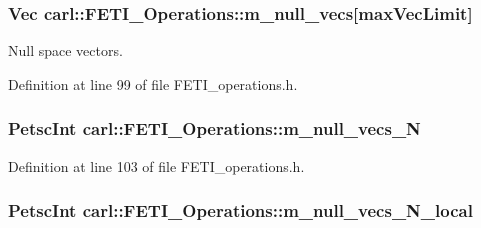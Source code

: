 \subsubsection[{m\+\_\+null\+\_\+vecs}]{\setlength{\rightskip}{0pt plus 5cm}Vec carl\+::\+F\+E\+T\+I\+\_\+\+Operations\+::m\+\_\+null\+\_\+vecs\mbox{[}{\bf max\+Vec\+Limit}\mbox{]}\hspace{0.3cm}{\ttfamily [protected]}}\label{classcarl_1_1_f_e_t_i___operations_a81ca84aa058155a0a0f586625c6f93b7}


Null space vectors. 



Definition at line 99 of file F\+E\+T\+I\+\_\+operations.\+h.

\hypertarget{classcarl_1_1_f_e_t_i___operations_aa9a450cb613998b62b4af846ff4b0453}{}
\subsubsection[{m\+\_\+null\+\_\+vecs\+\_\+\+N}]{\setlength{\rightskip}{0pt plus 5cm}Petsc\+Int carl\+::\+F\+E\+T\+I\+\_\+\+Operations\+::m\+\_\+null\+\_\+vecs\+\_\+\+N\hspace{0.3cm}{\ttfamily [protected]}}\label{classcarl_1_1_f_e_t_i___operations_aa9a450cb613998b62b4af846ff4b0453}


Definition at line 103 of file F\+E\+T\+I\+\_\+operations.\+h.

\hypertarget{classcarl_1_1_f_e_t_i___operations_a0b7be9a279d71535a43e7c808289f1df}{}
\subsubsection[{m\+\_\+null\+\_\+vecs\+\_\+\+N\+\_\+local}]{\setlength{\rightskip}{0pt plus 5cm}Petsc\+Int carl\+::\+F\+E\+T\+I\+\_\+\+Operations\+::m\+\_\+null\+\_\+vecs\+\_\+\+N\+\_\+local\hspace{0.3cm}{\ttfamily [protected]}}\label{classcarl_1_1_f_e_t_i___operations_a0b7be9a279d71535a43e7c808289f1df}


